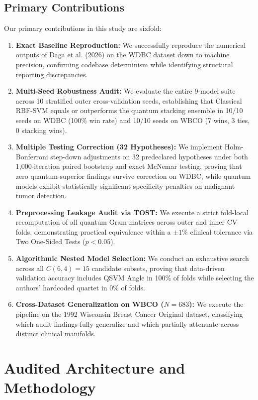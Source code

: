 \documentclass[journal,twocolumn]{IEEEtran}
\begin{document}
\subsection{Primary Contributions}
Our primary contributions in this study are sixfold:
\begin{enumerate}
    \item \textbf{Exact Baseline Reproduction:} We successfully reproduce the numerical outputs of Daga et al. (2026) on the WDBC dataset down to machine precision, confirming codebase determinism while identifying structural reporting discrepancies.
    \item \textbf{Multi-Seed Robustness Audit:} We evaluate the entire 9-model suite across 10 stratified outer cross-validation seeds, establishing that Classical RBF-SVM equals or outperforms the quantum stacking ensemble in 10/10 seeds on WDBC (100\% win rate) and 10/10 seeds on WBCO (7 wins, 3 ties, 0 stacking wins).
    \item \textbf{Multiple Testing Correction (32 Hypotheses):} We implement Holm-Bonferroni step-down adjustments on 32 predeclared hypotheses under both 1,000-iteration paired bootstrap and exact McNemar testing, proving that zero quantum-superior findings survive correction on WDBC, while quantum models exhibit statistically significant specificity penalties on malignant tumor detection.
    \item \textbf{Preprocessing Leakage Audit via TOST:} We execute a strict fold-local recomputation of all quantum Gram matrices across outer and inner CV folds, demonstrating practical equivalence within a $\pm 1\%$ clinical tolerance via Two One-Sided Tests ($p < 0.05$).
    \item \textbf{Algorithmic Nested Model Selection:} We conduct an exhaustive search across all $C(6,4)=15$ candidate subsets, proving that data-driven validation accuracy includes QSVM Angle in 100\% of folds while selecting the authors' hardcoded quartet in 0\% of folds.
    \item \textbf{Cross-Dataset Generalization on WBCO ($N=683$):} We execute the pipeline on the 1992 Wisconsin Breast Cancer Original dataset, classifying which audit findings fully generalize and which partially attenuate across distinct clinical manifolds.
\end{enumerate}

\section{Audited Architecture and Methodology}
\end{document}
